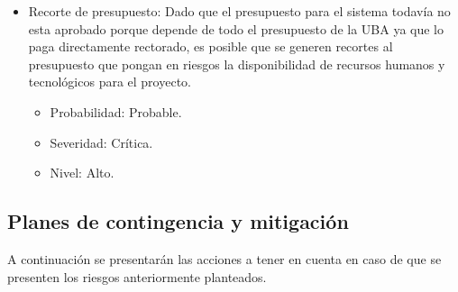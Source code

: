 \begin{itemize}
\bigskip

\item Recorte de presupuesto: Dado que el presupuesto para el sistema todav\'ia no esta aprobado porque depende de todo el presupuesto de la UBA ya que lo paga directamente rectorado, es posible que se generen recortes al presupuesto que pongan en riesgos la disponibilidad de recursos humanos y tecnol\'ogicos para el proyecto.
\begin{itemize}
\item Probabilidad: Probable.
\item Severidad: Cr\'itica.
\item Nivel: Alto.
\end{itemize}

\end{itemize}

\subsection{Planes de contingencia y mitigaci\'on}

A continuaci\'on se presentar\'an las acciones a tener en cuenta en caso de que se presenten los riesgos anteriormente planteados.

